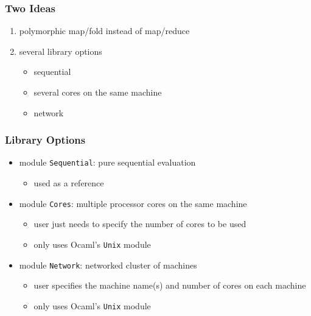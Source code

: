 \documentclass{beamer}
\let\emph\alert
\begin{document}
\begin{frame}\frametitle{Two Ideas}
  \begin{enumerate}
  \item polymorphic map/fold instead of map/reduce

    \bigskip
  \item several library options
    \begin{itemize}
    \item sequential 
    \item several cores on the same machine
    \item network
    \end{itemize}
  \end{enumerate}
\end{frame}

\begin{frame}\frametitle{Library Options}

  \begin{itemize}
  \item \emph{module \texttt{Sequential}}: pure sequential evaluation
    \begin{itemize}\item 
      used as a reference
    \end{itemize}

    \bigskip
  \item \emph{module \texttt{Cores}}: multiple processor cores on the same 
    machine
    \begin{itemize}
    \item user just needs to specify the number of cores to be used
    \item only uses Ocaml's \texttt{Unix} module
    \end{itemize}

    \bigskip
  \item \emph{module \texttt{Network}}: networked cluster of machines
    \begin{itemize}
    \item user specifies the machine name(s) and number of cores on
      each machine
    \item only uses Ocaml's \texttt{Unix} module
    \end{itemize}
  \end{itemize}
\end{frame}
\end{document}
